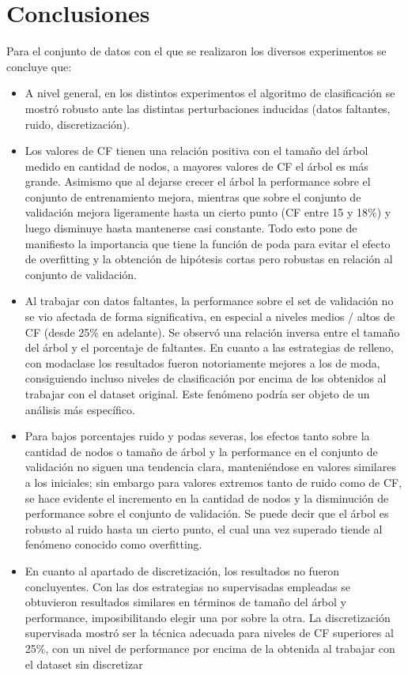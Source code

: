 \section{Conclusiones}

Para el conjunto de datos con el que se realizaron los diversos experimentos se concluye
que:

\begin{itemize}
 \item A nivel general, en los distintos experimentos el algoritmo de clasificación se
mostró robusto ante las distintas perturbaciones inducidas (datos faltantes, ruido,
discretización).

  \item Los valores de CF tienen una relación positiva con el tamaño del árbol medido en
cantidad de nodos, a mayores valores de CF el árbol es más grande. Asimismo
que al dejarse crecer el árbol la performance sobre el conjunto de entrenamiento
mejora, mientras que sobre el conjunto de validación mejora ligeramente hasta un
cierto punto (CF entre 15 y 18\%) y luego disminuye hasta mantenerse casi
constante. Todo esto pone de manifiesto la importancia que tiene la función de
poda para evitar el efecto de overfitting y la obtención de hipótesis cortas pero
robustas en relación al conjunto de validación.

  \item Al trabajar con datos faltantes, la performance sobre el set de validación no se vio
afectada de forma significativa, en especial a niveles medios / altos de CF (desde
25\% en adelante). Se observó una relación inversa entre el tamaño del árbol y el
porcentaje de faltantes. En cuanto a las estrategias de relleno, con modaclase los
resultados fueron notoriamente mejores a los de moda, consiguiendo incluso
niveles de clasificación por encima de los obtenidos al trabajar con el dataset
original. Este fenómeno podría ser objeto de un análisis más específico.

  \item Para bajos porcentajes ruido y podas severas, los efectos tanto sobre la cantidad
de nodos o tamaño de árbol y la performance en el conjunto de validación no
siguen una tendencia clara, manteniéndose en valores similares a los iniciales;
sin embargo para valores extremos tanto de ruido como de CF, se hace evidente
el incremento en la cantidad de nodos y la disminución de performance sobre el
conjunto de validación. Se puede decir que el árbol es robusto al ruido hasta un
cierto punto, el cual una vez superado tiende al fenómeno conocido como
overfitting.

  \item En cuanto al apartado de discretización, los resultados no fueron concluyentes.
Con las dos estrategias no supervisadas empleadas se obtuvieron resultados
similares en términos de tamaño del árbol y performance, imposibilitando elegir
una por sobre la otra. La discretización supervisada mostró ser la técnica
adecuada para niveles de CF superiores al 25\%, con un nivel de performance por
encima de la obtenida al trabajar con el dataset sin discretizar


\end{itemize}

